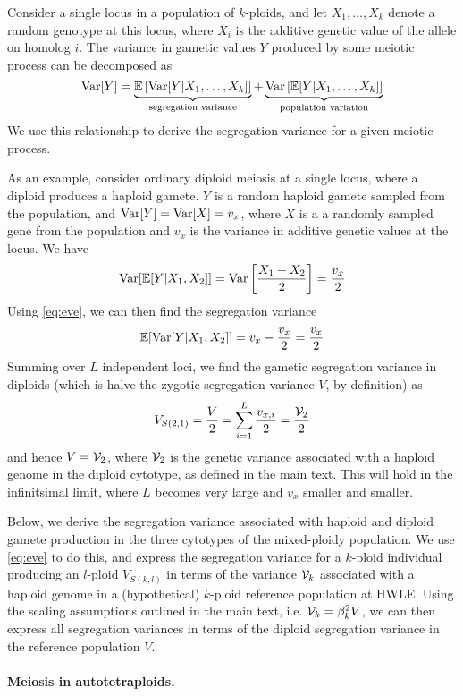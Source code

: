 \documentclass[11pt,a4paper]{article}
\begin{document}
Consider a single locus in a population of $k$-ploids, and let $X_1,\dots,X_k$
denote a random genotype at this locus, where $X_i$ is the additive genetic
value of the allele on homolog $i$.
The variance in gametic values $Y$ produced by some meiotic process can be
decomposed as 
\begin{equation}
  \mathrm{Var}[Y] = \underbrace{\mathbb{E}\left[\mathrm{Var}[Y|X_1, \dots, X_k]\right]}_{\text{segregation variance}} 
    + \underbrace{\mathrm{Var}\left[\mathbb{E}[Y|X_1, \dots, X_k]\right]}_{\text{population
variation}}
\label{eq:eve}
\end{equation}
We use this relationship to derive the segregation variance for a given meiotic
process.

As an example, consider ordinary diploid meiosis at a single locus, where a
diploid produces a haploid gamete. $Y$ is a random haploid gamete sampled from the
population, and $\mathrm{Var}[Y] = \mathrm{Var}[X] = v_x$, where $X$ is a a randomly sampled
gene from the population and $v_x$ is the variance in additive genetic values
at the locus.
We have
  $$\mathrm{Var}[\mathbb{E}[Y|X_1,X_2]] = \mathrm{Var}\left[\frac{X_1 + X_2}{2}\right] = \frac{v_x}{2}$$
Using \cref{eq:eve}, we can then find the segregation variance
  $$\mathbb{E}[\mathrm{Var}[Y|X_1,X_2]] = v_x - \frac{v_x}{2} = \frac{v_x}{2}$$
Summing over $L$ independent loci, we find the gametic segregation variance in
diploids (which is halve the zygotic segregation variance $V$, by definition) as
  $$V_{S(2,1)} = \frac{V}{2} = \sum_{i=1}^L \frac{v_{x,i}}{2} = \frac{\mathcal{V}_{2}}{2}$$
and hence $V=\mathcal{V}_{2}$, where $\mathcal{V}_{2}$ is the genetic variance associated with
a haploid genome in the diploid cytotype, as defined in the main text.
This will hold in the infinitsimal limit, where $L$ becomes very large and
$v_x$ smaller and smaller.

Below, we derive the segregation variance associated with haploid and diploid
gamete production in the three cytotypes of the mixed-ploidy population.
We use \cref{eq:eve} to do this, and express the segregation variance for a
$k$-ploid individual producing an $l$-ploid $V_{S(k,l)}$ in terms of the
variance $\mathcal{V}_{k}$ associated with a haploid genome in a (hypothetical)
$k$-ploid reference population at HWLE. Using the scaling assumptions outlined
in the main text, i.e. $\mathcal{V}_{k} = \beta_k^2 V$, we can then express all
segregation variances in terms of the diploid segregation variance in the
reference population $V$.

\paragraph{Meiosis in autotetraploids.}
\end{document}
